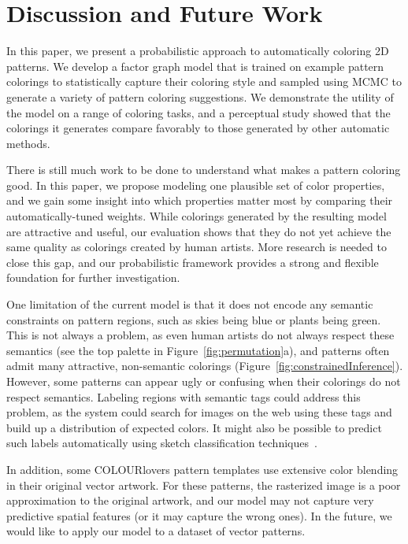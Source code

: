 \section{Discussion and Future Work}
\label{sec:discussion}

In this paper, we present a probabilistic approach to automatically coloring 2D patterns. We develop a factor graph model that is trained on example pattern colorings to statistically capture their coloring style and sampled using MCMC to generate a variety of pattern coloring suggestions. We demonstrate the utility of the model on a range of coloring tasks, and a perceptual study showed that the colorings it generates compare favorably to those generated by other automatic methods.

There is still much work to be done to understand what makes a pattern coloring good. In this paper, we propose modeling one plausible set of color properties, and we gain some insight into which properties matter most by comparing their automatically-tuned weights. While colorings generated by the resulting model are attractive and useful, our evaluation shows that they do not yet achieve the same quality as colorings created by human artists. More research is needed to close this gap, and our probabilistic framework provides a strong and flexible foundation for further investigation.

One limitation of the current model is that it does not encode any semantic constraints on pattern regions, such as skies being blue or plants being green. This is not always a problem, as even human artists do not always respect these semantics (see the top palette in Figure~\ref{fig:permutation}a), and patterns often admit many attractive, non-semantic colorings (Figure~\ref{fig:constrainedInference}). However, some patterns can appear ugly or confusing when their colorings do not respect semantics.
Labeling regions with semantic tags could address this problem, as the system could search for images on the web using these tags and build up a distribution of expected colors. It might also be possible to predict such labels automatically using sketch classification techniques~\cite{SketchClassification}.

In addition, some COLOURlovers pattern templates use extensive color blending in their original vector artwork. For these patterns, the rasterized image is a poor approximation to the original artwork, and our model may not capture very predictive spatial features (or it may capture the wrong ones). In the future, we would like to apply our model to a dataset of vector patterns.

